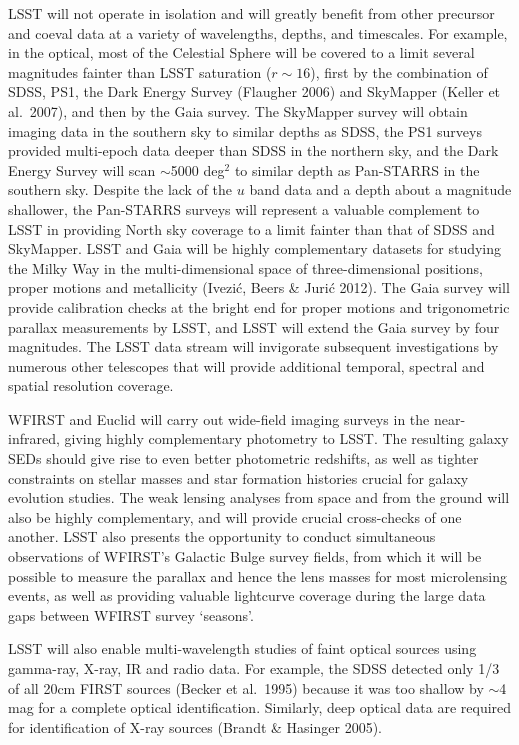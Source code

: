 LSST will not operate in isolation and will greatly benefit from other precursor and coeval 
data at a variety of wavelengths, depths, and timescales. For example,
in the optical, most of the Celestial 
Sphere will be covered to a limit several magnitudes fainter than LSST saturation 
($r\sim16$), first by the combination of SDSS, PS1, the Dark Energy Survey (Flaugher 2006) and SkyMapper (Keller et al.~2007), 
and then by the Gaia survey. The SkyMapper survey will obtain imaging data in the southern
sky to similar depths as SDSS, the PS1 surveys provided multi-epoch data deeper 
than SDSS in the northern sky, and the Dark Energy Survey will scan 
$\sim$5000 deg$^2$ to similar depth as Pan-STARRS in the southern sky. Despite the lack of 
the $u$ band data and a depth about a magnitude shallower, the Pan-STARRS surveys
will represent a valuable complement to LSST in providing North sky coverage to a limit 
fainter than that of SDSS and SkyMapper. LSST and Gaia will 
be highly complementary datasets for studying the Milky Way in the multi-dimensional space of 
three-dimensional positions, proper motions and metallicity (Ivezi\'{c}, Beers \& Juri\'{c} 2012). 
The Gaia survey will provide calibration checks at the bright end for proper 
motions and trigonometric parallax measurements by LSST, and LSST will extend the 
Gaia survey by four magnitudes. The LSST data stream will invigorate subsequent 
investigations by numerous other telescopes that will provide 
additional temporal, spectral and spatial resolution coverage. 

WFIRST and Euclid will carry out wide-field imaging surveys in the
near-infrared, giving highly complementary photometry to LSST.  The
resulting galaxy SEDs should give rise to even better photometric
redshifts, as well as tighter constraints on stellar masses and star
formation histories crucial for galaxy evolution studies.  The weak
lensing analyses from space and from the ground will also be highly
complementary, and will provide crucial cross-checks of one another. 
LSST also presents the opportunity to conduct simultaneous observations 
of WFIRST's Galactic Bulge survey fields, from which it will be possible to 
measure the parallax and hence the lens masses for most microlensing 
events, as well as providing valuable lightcurve coverage during the large 
data gaps between WFIRST survey `seasons'.

LSST will also enable multi-wavelength studies of faint optical
sources using gamma-ray, X-ray, IR and radio data.  For example, the
SDSS detected only 1/3 of all 20cm FIRST sources (Becker et al.~1995)
because it was too shallow by $\sim$4 mag for a complete optical
identification. Similarly, deep optical data are required for
identification of X-ray sources (Brandt \& Hasinger 2005).

